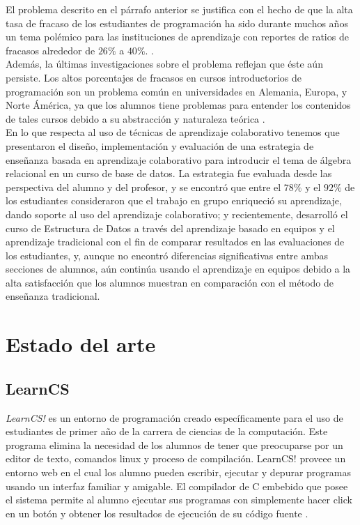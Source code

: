 \documentclass[twoside]{article}
\begin{document}
\begin{multicols}{2}
El problema descrito en el párrafo anterior se justifica con el hecho de que la alta tasa de fracaso de los estudiantes de programación ha sido durante muchos años un tema polémico para las instituciones de aprendizaje con reportes de ratios de fracasos alrededor de $26\%$ a $40\%$. \cite{sheard_our_1998,truong_web_2003,lang_seven_2007,han_enhancement_2010}.\\

Además, la últimas investigaciones sobre el problema reflejan que éste aún persiste. Los altos porcentajes de fracasos en cursos introductorios de programación son un problema común en universidades en Alemania, Europa, y Norte Ámérica, ya que los alumnos tiene problemas para entender los contenidos de tales cursos debido a su abstracción y naturaleza teórica \cite{knobelsdorf_teaching_2014}.\\

En lo que respecta al uso de técnicas de aprendizaje colaborativo tenemos que  presentaron el diseño, implementación y evaluación de una estrategia de enseñanza basada en aprendizaje colaborativo para introducir el tema de álgebra relacional en un curso de base de datos. La estrategia fue evaluada desde las perspectiva del alumno y del profesor, y se encontró que entre el $78\%$ y el $92\%$ de los estudiantes consideraron que el trabajo en grupo enriqueció su aprendizaje, dando soporte al uso del aprendizaje colaborativo; y recientemente,  desarrolló el curso de Estructura de Datos a través del aprendizaje basado en equipos y el aprendizaje tradicional con el fin de comparar resultados en las evaluaciones de los estudiantes, y, aunque no encontró diferencias significativas entre ambas secciones de alumnos, aún continúa usando el aprendizaje en equipos debido a la alta satisfacción que los alumnos muestran en comparación con el método de enseñanza tradicional.\\


\section{Estado del arte}

\subsection*{LearnCS}
\emph{LearnCS!} es un entorno de programación creado específicamente para el uso de estudiantes de primer año de la carrera de ciencias de la computación. Este programa elimina la necesidad de los alumnos de tener que preocuparse por un editor de texto, comandos linux y proceso de compilación. LearnCS! proveee un entorno web en el cual los alumno pueden escribir, ejecutar y depurar programas usando un interfaz familiar y amigable. El compilador de C embebido que posee el sistema permite al alumno ejecutar sus programas con simplemente hacer click en un botón y obtener los resultados de ejecución de su código fuente \cite{lipman_learncs_2014}.\\


\end{multicols}
\end{document}
